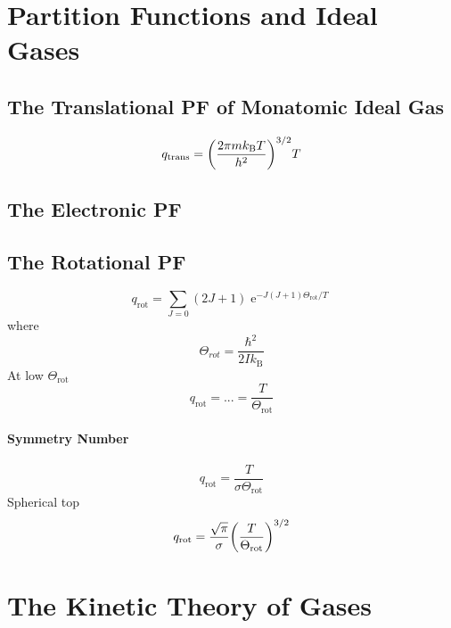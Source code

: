 \documentclass[a4paper]{article}
\DeclareMathOperator{\e}{\mathrm{e}}
\newcommand{\kB}{k_\mathrm{B}}
\DeclareMathOperator{\trans}{\mathrm{trans}}
\DeclareMathOperator{\rot}{\mathrm{rot}}
\numberwithin{equation}{section}
\begin{document}
\section{Partition Functions and Ideal Gases}
\subsection{The Translational PF of Monatomic Ideal Gas}
\begin{equation}\label{key}
q_{\trans} = \qty(\dfrac{2\pi m \kB T}{h^2})^{3/2} T
\end{equation}

\subsection{The Electronic PF}

\subsection{}

\subsection{The Rotational PF}
\begin{equation}\label{key}
q_{\rot} = \sum_{J=0} (2J+1)\e^{-J(J+1)\Theta_{\rot}/T}
\end{equation}
where
\begin{equation}\label{key}
\Theta_{rot} = \dfrac{\hbar^2}{2I\kB}
\end{equation}
At low $ \Theta_{\rot} $
\begin{equation}\label{key}
q_{\rot} = ... = \dfrac{T}{\Theta_{\rot}}
\end{equation}

\paragraph{Symmetry Number}
\begin{equation}\label{key}
q_{\rot} = \dfrac{T}{\sigma \Theta_{\rot}}
\end{equation}
Spherical top
\begin{equation}\label{key}
q_{\rot} = \dfrac{\sqrt{\pi}}{\sigma}\qty(\dfrac{T}{\Theta_{\rot}})^{3/2}
\end{equation}

\setcounter{section}{24}
\section{The Kinetic Theory of Gases}
\end{document}
